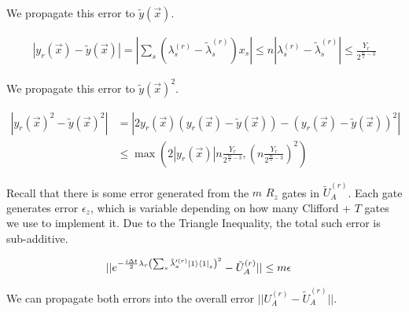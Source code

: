 We propagate this error to $\tilde{y}(\vec{x})$.

\begin{equation}
    \begin{split}
        |y_r(\vec{x}) - \tilde{y}(\vec{x})| = |\sum_s (\lambda^{(r)}_s - \tilde{\lambda}^{(r)}_s)x_s| \leq n|\lambda^{(r)}_s - \tilde{\lambda}^{(r)}_s| \leq \frac{Y_r}{2^{\frac{m}{2} - 3}}
    \end{split}
\end{equation}

We propagate this error to $\tilde{y}(\vec{x})^2$.

\begin{equation}
    \begin{split}
        |y_r(\vec{x})^2 - \tilde{y}(\vec{x})^2| &= |2y_r(\vec{x})(y_r(\vec{x}) - \tilde{y}(\vec{x})) - (y_r(\vec{x}) - \tilde{y}(\vec{x}))^2| \\
        &\leq \max\left(2|y_r(\vec{x})|n\frac{Y_r}{2^{\frac{m}{2} - 3}}, \left(n\frac{Y_r}{2^{\frac{m}{2} - 3}}\right)^2\right)
    \end{split}
\end{equation}

Recall that there is some error generated from the $m$ $R_z$ gates in $\tilde{U}_A^{(r)}$. Each gate generates error $\epsilon_z$, which is variable depending on how many Clifford + $T$ gates we use to implement it. Due to the Triangle Inequality, the total such error is sub-additive.

\begin{equation}
    \begin{split}
        ||e^{-\frac{i\Delta t}{2}\lambda_r\left(\sum_s \tilde{\lambda}'^{(r)}_s \ket{1}\bra{1}_s\right)^2} - \tilde{U}_A^{(r)}|| &\leq m\epsilon
    \end{split}
\end{equation}

We can propagate both errors into the overall error $||U_A^{(r)} - \tilde{U}_A^{(r)}||$.

